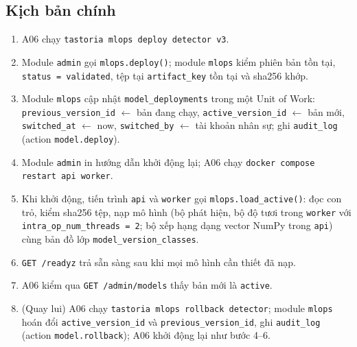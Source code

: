 \subsection{Kịch bản chính}
\begin{enumerate}
\item A06 chạy {\small\texttt{tastoria mlops deploy detector v3}}.
\item Module {\small\texttt{admin}} gọi {\small\texttt{mlops.\allowbreak{}deploy()}}; module {\small\texttt{mlops}} kiểm phiên bản tồn tại, {\small\texttt{status = validated}}, tệp tại {\small\texttt{artifact\_\allowbreak{}\allowbreak{}key}} tồn tại và sha256 khớp.
\item Module {\small\texttt{mlops}} cập nhật {\small\texttt{model\_\allowbreak{}\allowbreak{}deployments}} trong một Unit of Work: {\small\texttt{previous\_\allowbreak{}\allowbreak{}version\_\allowbreak{}\allowbreak{}id}} \ensuremath{\leftarrow} bản đang chạy, {\small\texttt{active\_\allowbreak{}\allowbreak{}version\_\allowbreak{}\allowbreak{}id}} \ensuremath{\leftarrow} bản mới, {\small\texttt{switched\_\allowbreak{}\allowbreak{}at}} \ensuremath{\leftarrow} now, {\small\texttt{switched\_\allowbreak{}\allowbreak{}by}} \ensuremath{\leftarrow} tài khoản nhân sự; ghi {\small\texttt{audit\_\allowbreak{}\allowbreak{}log}} (action {\small\texttt{model.\allowbreak{}deploy}}).
\item Module {\small\texttt{admin}} in hướng dẫn khởi động lại; A06 chạy {\small\texttt{docker compose restart api worker}}.
\item Khi khởi động, tiến trình {\small\texttt{api}} và {\small\texttt{worker}} gọi {\small\texttt{mlops.\allowbreak{}load\_\allowbreak{}\allowbreak{}active()}}: đọc con trỏ, kiểm sha256 tệp, nạp mô hình (bộ phát hiện, bộ độ tươi trong {\small\texttt{worker}} với {\small\texttt{intra\_\allowbreak{}\allowbreak{}op\_\allowbreak{}\allowbreak{}num\_\allowbreak{}\allowbreak{}threads = 2}}; bộ xếp hạng dạng vector NumPy trong {\small\texttt{api}}) cùng bản đồ lớp {\small\texttt{model\_\allowbreak{}\allowbreak{}version\_\allowbreak{}\allowbreak{}classes}}.
\item {\small\texttt{GET /\allowbreak{}\allowbreak{}readyz}} trả sẵn sàng sau khi mọi mô hình cần thiết đã nạp.
\item A06 kiểm qua {\small\texttt{GET /\allowbreak{}\allowbreak{}admin/\allowbreak{}\allowbreak{}models}} thấy bản mới là {\small\texttt{active}}.
\item (Quay lui) A06 chạy {\small\texttt{tastoria mlops rollback detector}}; module {\small\texttt{mlops}} hoán đổi {\small\texttt{active\_\allowbreak{}\allowbreak{}version\_\allowbreak{}\allowbreak{}id}} và {\small\texttt{previous\_\allowbreak{}\allowbreak{}version\_\allowbreak{}\allowbreak{}id}}, ghi {\small\texttt{audit\_\allowbreak{}\allowbreak{}log}} (action {\small\texttt{model.\allowbreak{}rollback}}); A06 khởi động lại như bước 4--6.
\end{enumerate}
